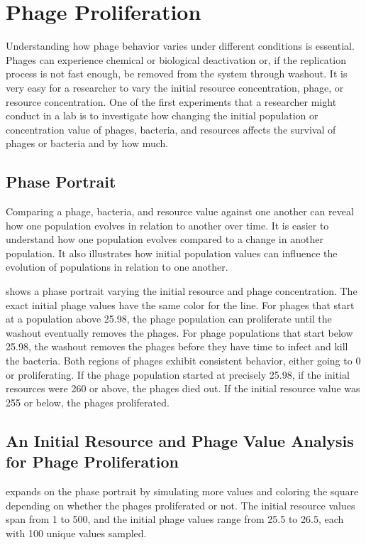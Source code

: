 \section{Phage Proliferation}
Understanding how phage behavior varies under different conditions is essential. 
Phages can experience chemical or biological deactivation or, if the replication process is not fast enough, be removed from the system through washout. 
It is very easy for a researcher to vary the initial resource concentration, phage, or resource concentration. 
One of the first experiments that a researcher might conduct in a lab is to investigate how changing the initial population or concentration value of phages, bacteria, and resources affects the survival of phages or bacteria and by how much. 

\subsection{Phase Portrait}
\label{sec:results:phase_portrait}
Comparing a phage, bacteria, and resource value against one another can reveal how one population evolves in relation to another over time. 
It is easier to understand how one population evolves compared to a change in another population. 
It also illustrates how initial population values can influence the evolution of populations in relation to one another. 

 shows a phase portrait varying the initial resource and phage concentration. 
The exact initial phage values have the same color for the line. 
For phages that start at a population above 25.98, the phage population can proliferate until the washout eventually removes the phages. 
For phage populations that start below 25.98, the washout removes the phages before they have time to infect and kill the bacteria. 
Both regions of phages exhibit consistent behavior, either going to 0 or proliferating. 
If the phage population started at precisely 25.98, if the initial resources were 260 or above, the phages died out. 
If the initial resource value was 255 or below, the phages proliferated. 

\subsection{An Initial Resource and Phage Value Analysis for Phage Proliferation}
 expands on the phase portrait by simulating more values and coloring the square depending on whether the phages proliferated or not. 
The initial resource values span from 1 to 500, and the initial phage values range from 25.5 to 26.5, each with 100 unique values sampled.

